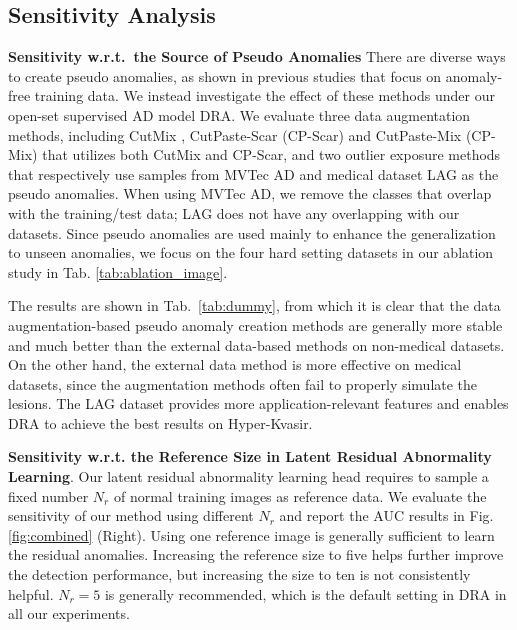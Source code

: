 \documentclass[10pt,twocolumn,letterpaper]{article}
\begin{document}
\subsection{Sensitivity Analysis} \label{sec:sensitivity}

\textbf{Sensitivity w.r.t.\  the Source of Pseudo Anomalies} 
There are diverse ways to create pseudo anomalies, as shown in previous studies \cite{li2021cutpaste,reiss2021panda,tack2020csi,hendrycks2018deep} that focus on anomaly-free training data. 
We instead investigate the effect of these methods under our open-set supervised AD model DRA. We evaluate three data augmentation methods, including CutMix \cite{yun2019cutmix}, CutPaste-Scar (CP-Scar) \cite{li2021cutpaste} and CutPaste-Mix (CP-Mix) that utilizes both CutMix and CP-Scar, and two outlier exposure methods that respectively use samples from MVTec AD \cite{Bergmann_2019_CVPR} and medical dataset LAG \cite{Li_2019_CVPR} as the pseudo anomalies.
When using MVTec AD, we remove the classes that overlap with the training/test data; LAG does not have any overlapping with our datasets. Since pseudo anomalies are used mainly to enhance the generalization to unseen anomalies, we focus on the four hard setting datasets in our ablation study in Tab. \ref{tab:ablation_image}.

The results are shown in Tab.~\ref{tab:dummy}, from which it is clear that the data augmentation-based pseudo anomaly creation methods are generally more stable and much better than the external data-based methods on non-medical datasets. 
On the other hand, the external data method is more effective on medical datasets, since the augmentation methods often fail to properly simulate the lesions. The LAG dataset provides more application-relevant features and enables DRA to achieve the best results on Hyper-Kvasir.



\textbf{Sensitivity w.r.t. the Reference Size in Latent Residual Abnormality Learning}. Our latent residual abnormality learning head requires to sample a fixed number $\mathit{N}_{r}$ of normal training images as reference data. We evaluate the sensitivity of our method using different $\mathit{N}_{r}$ and report the AUC results in Fig. \ref{fig:combined} (Right). 
Using one reference image is generally sufficient to learn the residual anomalies. 
Increasing the reference size to five helps further improve the detection performance, but increasing the size to ten is not consistently helpful. $\mathit{N}_{r}=5$ is generally recommended, which is the default setting in DRA in all our experiments.
\vspace{-0.1cm}
\end{document}
